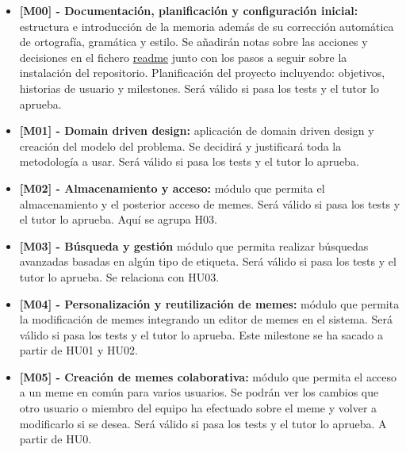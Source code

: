 \begin{itemize}
    \item \textbf{[M00] - Documentación, planificación y configuración inicial: }estructura e introducción de la memoria además de su corrección automática de ortografía, gramática y estilo. Se añadirán notas sobre las acciones y decisiones en el fichero \href{https://www.makeareadme.com/}{readme} junto con los pasos a seguir sobre la instalación del repositorio. Planificación del proyecto incluyendo: objetivos, historias de usuario y milestones. Será válido si pasa los tests y el tutor lo aprueba.
    \item \textbf{[M01] - Domain driven design: }aplicación de domain driven design y creación del modelo del problema. Se decidirá y justificará toda la metodología a usar. Será válido si pasa los tests y el tutor lo aprueba.
    \item \textbf{[M02] - Almacenamiento y acceso: }módulo que permita el almacenamiento y el posterior acceso de memes. Será válido si pasa los tests y el tutor lo aprueba. Aquí se agrupa H03.
    \item \textbf{[M03] - Búsqueda y gestión }módulo que permita realizar búsquedas avanzadas basadas en algún tipo de etiqueta. Será válido si pasa los tests y el tutor lo aprueba. Se relaciona con HU03.
    \item \textbf{[M04] - Personalización y reutilización de memes: }módulo que permita la modificación de memes integrando un editor de memes en el sistema. Será válido si pasa los tests y el tutor lo aprueba. Este milestone se ha sacado a partir de HU01 y HU02.
    \item \textbf{[M05] - Creación de memes colaborativa: }módulo que permita el acceso a un meme en común para varios usuarios. Se podrán ver los cambios que otro usuario o miembro del equipo ha efectuado sobre el meme y volver a modificarlo si se desea. Será válido si pasa los tests y el tutor lo aprueba. A partir de HU0.
\end{itemize}

